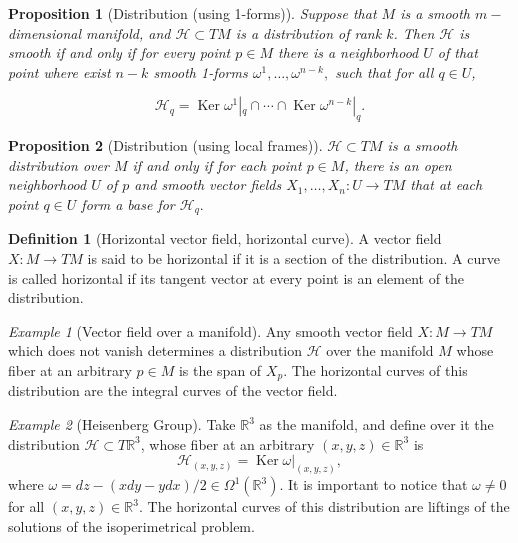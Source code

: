 \documentclass [xcolor=svgnames, t] {beamer}
\theoremstyle{definition}
\newtheorem{df}{Definition}
\theoremstyle{plain}
\newtheorem{prop}{Proposition}
\theoremstyle{remark}
\newtheorem{ex}{Example}
\begin{document}
\begin{frame}[fragile]
	
\begin{prop}[Distribution (using 1-forms)]
	Suppose that $ M $ is a smooth $ m- $dimensional manifold, and $ \mathcal{H} \subset TM$ is a distribution of rank $k$. Then $ \mathcal{H} $ is smooth if and only if for every point $ p\in M $ there is a neighborhood $ U $ of that point where exist $n-k$ smooth 1-forms $ \omega^1,\dots,\omega^{n-k}, $ such that for all $ q\in U $,

	$$ \mathcal{H}_q = \operatorname{Ker} \omega^1|_q\cap \cdots \cap\operatorname{Ker} \omega^{n-k}|_q.  $$ 
\end{prop}
\begin{prop} [Distribution (using local frames)]
	$ \mathcal{H}\subset TM $ is a smooth distribution over $M  $ if and only if  for each point $ p\in M $, there is an open neighborhood $ U $ of $ p $  and smooth vector fields $ X_1,\dots,X_n: U \rightarrow {TM} $ that at each point  $ q\in U $ form a base for $ \mathcal{H}_q. $ 
\end{prop}
\begin{df}[Horizontal vector field, horizontal curve]
	A vector field $ X: M \rightarrow TM $ is said to be horizontal if it is a section of the distribution. A curve is called horizontal if its tangent vector at every point is an element of the distribution.	
\end{df}
\end{frame}
\begin{frame}[fragile]
\begin{ex}[Vector field over a manifold]\label{ex:vect_field}
Any smooth vector field $ X: M \rightarrow {TM} $ which does not vanish  determines a distribution $ \mathcal{H}$ over the manifold $ M $ whose fiber at an arbitrary $ p\in M $ is the span of $ X_p. $ The horizontal curves of this distribution are the integral curves of the vector field.
\end{ex}
\begin{ex}[Heisenberg Group]\label{ex:heis_group}
	Take $ \mathbb{R} ^3 $ as the manifold, and define over it the distribution $ \mathcal{H}\subset T \mathbb{R} ^3 $, whose fiber at an arbitrary $ (x,y,z)\in \mathbb{R}^3  $ is   
	$$ \mathcal{H}_{(x,y,z)} = \operatorname{Ker} \omega|_{(x,y,z)},$$
	where $ \omega = dz-(x dy-y dx)/2\in\Omega^1( \mathbb{R}^3).$ It is important to notice that $ \omega\neq 0 $ for all $ (x,y,z)\in \mathbb{R}^3. $ The horizontal curves of this distribution are liftings of the solutions of the isoperimetrical problem.
\end{ex}
\end{frame}
\end{document}
